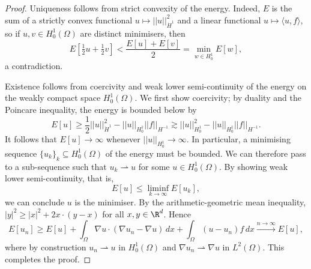 \documentclass[reqno]{amsart}
\theoremstyle{definition}
\theoremstyle{remark}
\begin{document}
\begin{proof}
	Uniqueness follows from strict convexity of the energy. Indeed, $E$ is the sum of a strictly convex functional $u \mapsto ||u||_{\dot H^1}^2$ and a linear functional $u \mapsto \langle u, f\rangle$, so if $u, v \in H^1_0 (\Omega)$ are distinct minimisers, then 
		\[ E[\tfrac12 u + \tfrac12 v] < \frac{E[u] + E[v]}{2} = \min_{w \in H^1_0} E[w], \]
	a contradiction. 	
	
	Existence follows from coercivity and weak lower semi-continuity of the energy on the weakly compact space $H^1_0 (\Omega)$. We first show coercivity; by duality and the Poincare inequality, the energy is bounded below by 
		\[ E[u] \geq \frac12 ||u||_{\dot H^1}^2 - ||u||_{H^1_0} ||f||_{H^{-1}} \gtrsim ||u||_{H^1_0}^2 - ||u||_{H^1_0} ||f||_{H^{-1}}. \]
	It follows that $E[u] \to \infty$ whenever $||u||_{H^1_0} \to \infty$. In particular, a minimising sequence $\{ u_k \}_k \subseteq H^1_0 (\Omega)$ of the energy must be bounded. We can therefore pass to a sub-sequence such that $u_k \rightharpoonup u$ for some $u \in H^1_0 (\Omega)$. By showing weak lower semi-continuity, that is, 
		\[ E[u] \leq \liminf_{k \to \infty} E[u_k] ,\]
	we can conclude $u$ is the minimiser. By the arithmetic-geometric mean inequality, $|y|^2 \geq |x|^2 + 2 x \cdot (y - x)$ for all $x,y \in \R^d$. Hence
		\[ E[u_n] \geq E[u] + \int_\Omega \nabla u \cdot (\nabla u_n - \nabla u) \, dx + \int_\Omega (u - u_n ) f  \, dx \overset{n \to \infty}{\longrightarrow} E[u],  \]
	where by construction $u_n \rightharpoonup u$ in $H^1_0 (\Omega)$ and $\nabla u_n \rightharpoonup \nabla u$ in $L^2 (\Omega)$. This completes the proof.
\end{proof}
\end{document}
